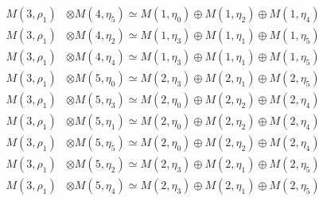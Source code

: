 \begin{align*}
M(3,\rho_{1}) &\otimes M(4,\eta_{5}) \simeq M(1,\eta_{0}) \oplus M(1,\eta_{2}) \oplus M(1,\eta_{4})\\
M(3,\rho_{1}) &\otimes M(4,\eta_{2}) \simeq M(1,\eta_{3}) \oplus M(1,\eta_{1}) \oplus M(1,\eta_{5})\\
M(3,\rho_{1}) &\otimes M(4,\eta_{4}) \simeq M(1,\eta_{3}) \oplus M(1,\eta_{1}) \oplus M(1,\eta_{5})\\
M(3,\rho_{1}) &\otimes M(5,\eta_{0}) \simeq M(2,\eta_{3}) \oplus M(2,\eta_{1}) \oplus M(2,\eta_{5})\\
M(3,\rho_{1}) &\otimes M(5,\eta_{3}) \simeq M(2,\eta_{0}) \oplus M(2,\eta_{2}) \oplus M(2,\eta_{4})\\
M(3,\rho_{1}) &\otimes M(5,\eta_{1}) \simeq M(2,\eta_{0}) \oplus M(2,\eta_{2}) \oplus M(2,\eta_{4})\\
M(3,\rho_{1}) &\otimes M(5,\eta_{5}) \simeq M(2,\eta_{0}) \oplus M(2,\eta_{2}) \oplus M(2,\eta_{4})\\
M(3,\rho_{1}) &\otimes M(5,\eta_{2}) \simeq M(2,\eta_{3}) \oplus M(2,\eta_{1}) \oplus M(2,\eta_{5})\\
M(3,\rho_{1}) &\otimes M(5,\eta_{4}) \simeq M(2,\eta_{3}) \oplus M(2,\eta_{1}) \oplus M(2,\eta_{5})\\
\end{align*}

